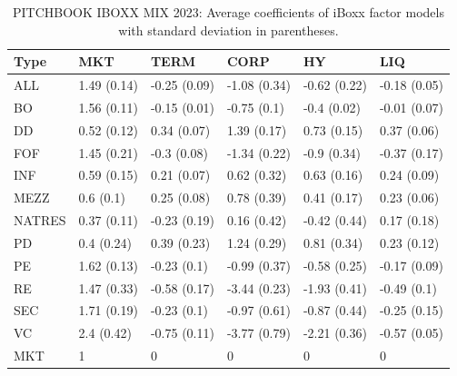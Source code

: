 \begin{table}[ht]
	\centering
	\begin{tabular}{llllll}
		Type & MKT & TERM & CORP & HY & LIQ \\ 
		\hline
		\hline
		ALL & 1.49 (0.14) & -0.25 (0.09) & -1.08 (0.34) & -0.62 (0.22) & -0.18 (0.05) \\ 
		BO & 1.56 (0.11) & -0.15 (0.01) & -0.75 (0.1) & -0.4 (0.02) & -0.01 (0.07) \\ 
		DD & 0.52 (0.12) & 0.34 (0.07) & 1.39 (0.17) & 0.73 (0.15) & 0.37 (0.06) \\ 
		FOF & 1.45 (0.21) & -0.3 (0.08) & -1.34 (0.22) & -0.9 (0.34) & -0.37 (0.17) \\ 
		INF & 0.59 (0.15) & 0.21 (0.07) & 0.62 (0.32) & 0.63 (0.16) & 0.24 (0.09) \\ 
		MEZZ & 0.6 (0.1) & 0.25 (0.08) & 0.78 (0.39) & 0.41 (0.17) & 0.23 (0.06) \\ 
		NATRES & 0.37 (0.11) & -0.23 (0.19) & 0.16 (0.42) & -0.42 (0.44) & 0.17 (0.18) \\ 
		PD & 0.4 (0.24) & 0.39 (0.23) & 1.24 (0.29) & 0.81 (0.34) & 0.23 (0.12) \\ 
		PE & 1.62 (0.13) & -0.23 (0.1) & -0.99 (0.37) & -0.58 (0.25) & -0.17 (0.09) \\ 
		RE & 1.47 (0.33) & -0.58 (0.17) & -3.44 (0.23) & -1.93 (0.41) & -0.49 (0.1) \\ 
		SEC & 1.71 (0.19) & -0.23 (0.1) & -0.97 (0.61) & -0.87 (0.44) & -0.25 (0.15) \\ 
		VC & 2.4 (0.42) & -0.75 (0.11) & -3.77 (0.79) & -2.21 (0.36) & -0.57 (0.05) \\ 
		\hline
		MKT & 1 & 0 & 0 & 0 & 0 \\ 
		\hline
		\hline
	\end{tabular}
	\caption{PITCHBOOK IBOXX MIX 2023: 
		Average coefficients of iBoxx factor models with standard deviation in parentheses.} 
	\label{tab:average_coefs_iboxx}
\end{table}


\iffalse

